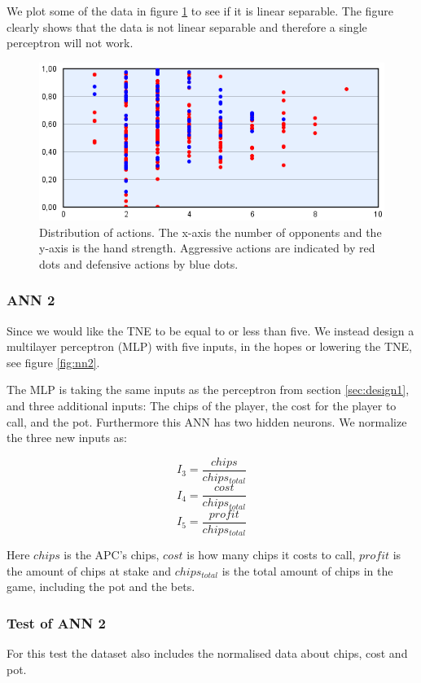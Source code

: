We plot some of the data in figure \ref{fig:linear-separable} to see if it is linear separable.  The figure clearly shows that the data is not linear separable and therefore a single perceptron will not work.


\begin{figure}[H]
  \center
    \includegraphics[scale=0.8]{images/nn/default-nn1-plot.png}
  \caption{Distribution of actions. The x-axis  the number of opponents and the y-axis is the hand strength. Aggressive actions are indicated by red dots and defensive actions by blue dots. \label{fig:linear-separable}}
\end{figure}

\subsubsection{ANN 2}
\label{sec:design2}
Since we would like the TNE to be equal to or less than five. We instead design a multilayer perceptron (MLP) with five inputs, in the hopes or lowering the TNE, see figure \ref{fig:nn2}.

The MLP is taking the same inputs as the perceptron from section \ref{sec:design1}, and three additional inputs: The chips of the player, the cost for the player to call, and the pot. Furthermore this ANN has two hidden neurons. We normalize the three new inputs as: 

\[I_{3} = \frac{chips}{chips_{total}}\] 
\[I_{4} = \frac{cost}{chips_{total}}\]
\[I_{5} = \frac{profit}{chips_{total}}\]

Here $chips$ is the APC's chips, $cost$ is how many chips it costs to call, $profit$ is the amount of chips at stake and $chips_{total}$ is the total amount of chips in the game, including the pot and the bets.





\subsubsection{Test of ANN 2}
\label{sec:ann-test2}
For this test the dataset also includes the normalised data about chips, cost and pot.

